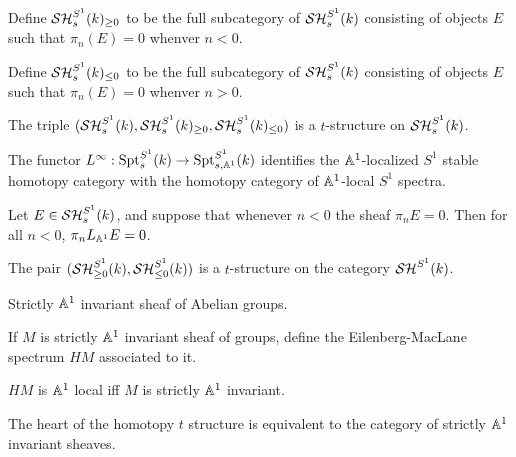 \documentclass{amsart}%
\begin{document}
\begin{definition}[$t$-structure on $\SH_s^{S^1}(k)$]
  Define $\mathcal{SH}_s^{S^1}(k)_{\geq 0}$ to be the full subcategory of
  $\SH_s^{S^1}(k)$ consisting of objects $E$ such that $\pi_n(E)=0$
  whenver $n<0$.
  
  Define $\mathcal{SH}_s^{S^1}(k)_{\leq 0}$ to be the full subcategory of
  $\SH_s^{S^1}(k)$ consisting of objects $E$ such that $\pi_n(E)=0$
  whenver $n>0$.
\end{definition}

\begin{theorem}
  The triple
  $(\mathcal{SH}_s^{S^1}(k), \mathcal{SH}_s^{S^1}(k)_{\geq 0}, \mathcal{SH}_s^{S^1}(k)_{\leq 0})$
  is a $t$-structure on $\SH_s^{S^1}(k)$. 
\end{theorem}

\begin{proposition}\cite[Lemma4.2.4]{Mor03}
  The functor
  $L^{\infty} : \mathrm{Spt}^{S^1}_s(k) \to \mathrm{Spt}^{S^1}_{s,\mathbb{A}^1}(k)$
  identifies the $\mathbb{A}^1$-localized $S^1$ stable homotopy category
  with the homotopy category of $\mathbb{A}^1$-local $S^1$ spectra.
\end{proposition}

\begin{theorem}
  Let $E \in \mathcal{SH}_s^{S^1}(k)$, and suppose that whenever $n < 0$ the
  sheaf $\pi_n E = 0$. Then for all $n<0$, $\pi_n L_{\mathbb{A}^1}E = 0$.
\end{theorem}

\begin{theorem}
  The pair $(\mathcal{SH}_{\geq 0}^{S^1}(k), \mathcal{SH}_{\leq 0}^{S^1}(k))$ is a
  $t$-structure on the category $\mathcal{SH}^{S^1}(k)$. 
\end{theorem}

\begin{definition}
  Strictly $\mathbb{A}^1$ invariant sheaf of Abelian groups.

  If $M$ is strictly $\mathbb{A}^1$ invariant sheaf of groups, define the
  Eilenberg-MacLane spectrum $HM$ associated to it. 
\end{definition}

\begin{proposition}
  $HM$ is $\mathbb{A}^1$ local iff $M$ is strictly $\mathbb{A}^1$ invariant.
\end{proposition}

\begin{proposition}
  The heart of the homotopy $t$ structure is equivalent to the
  category of strictly $\mathbb{A}^1$ invariant sheaves. 
\end{proposition}
\end{document}
